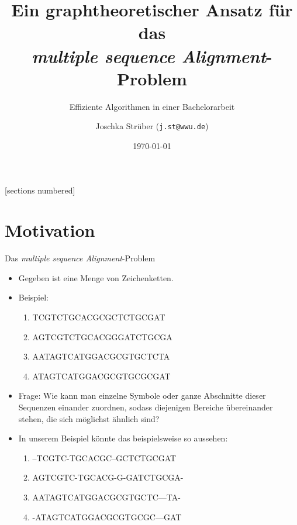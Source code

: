 \documentclass[wide,xcolor={x11names},hyperref={colorlinks=false},pantone312]{beamer}
\author{Joschka Strüber (\texttt{j.st@wwu.de})}
\title{Ein graphtheoretischer Ansatz für das \\ \textit{multiple sequence Alignment}-Problem}
\subtitle{\glqq Effiziente Algorithmen\grqq{} in einer Bachelorarbeit}
\date{\today}
\begin{document}
[sections numbered]

\begin{frame}[plain]
  \maketitle
\end{frame}

\begin{frame}[t]{}
\end{frame}

\AtBeginSection[]
{
	\begin{frame}[t]
		\tableofcontents[currentsection, hidesubsections, hideothersubsections,sectionstyle=show/shaded]
	\end{frame}
}

\section{Motivation}

\begin{frame}[t]{Das \textit{multiple sequence Alignment}-Problem}
	\begin{itemize}
		\item Gegeben ist eine Menge von Zeichenketten.
		\item Beispiel:
		\begin{enumerate}
			\ttfamily
			\item TCGTCTGCACGCGCTCTGCGAT
			\item AGTCGTCTGCACGGGATCTGCGA
			\item AATAGTCATGGACGCGTGCTCTA
			\item ATAGTCATGGACGCGTGCGCGAT
			\normalfont
		\end{enumerate}
		\item Frage: Wie kann man einzelne Symbole oder ganze Abschnitte dieser Sequenzen einander zuordnen, sodass diejenigen Bereiche übereinander stehen, die sich möglichst ähnlich sind? \pause
		\item In unserem Beispiel könnte das beispielsweise so aussehen:
		\begin{enumerate}
			\ttfamily
			\item --TCGTC-TGCACGC--GCTCTGCGAT
			\item AGTCGTC-TGCACG-G-GATCTGCGA-
			\item AATAGTCATGGACGCGTGCTC---TA-
			\item -ATAGTCATGGACGCGTGCGC---GAT
			\normalfont
		\end{enumerate}		
	\end{itemize}
\end{frame}
\end{document}
